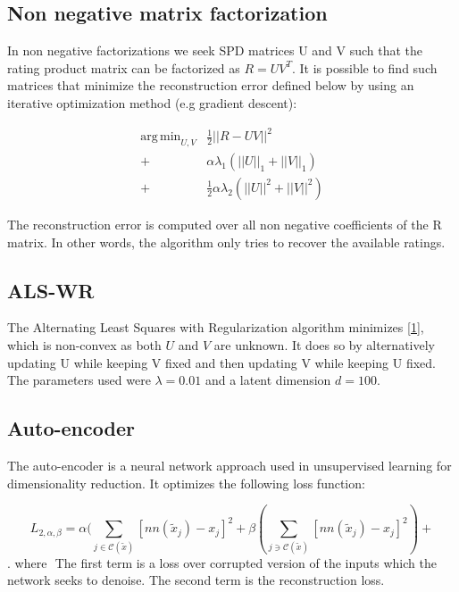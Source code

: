 \documentclass[10pt,twocolumn]{article}
\DeclareMathOperator*{\argmin}{arg\,min}
\begin{document}
\subsection{Non negative matrix factorization}

In non negative factorizations we seek SPD matrices U and V such that the rating product matrix can be factorized as $R = UV^T$. It is possible to find such matrices that minimize the reconstruction error defined below by using an iterative optimization method (e.g gradient descent): 

\begin{equation}
\begin{split}
\argmin_{U,V} & \frac{1}{2} ||R - UV||^2 \\
			  + & \alpha \lambda_1 (||U||_1 + ||V||_1) \\
			  + & \frac{1}{2} \alpha \lambda_2  (||U||^2 + ||V||^2) 
\end{split}
\end{equation}  

The reconstruction error is computed over all non negative coefficients of the R matrix. In other words, the algorithm only tries to recover the available ratings. 

\subsection{ALS-WR}

The Alternating Least Squares with Regularization algorithm \cite{zhou2008large}  minimizes \eqref{1}, which is non-convex as both $U$ and $V$ are unknown. It does so by alternatively updating U while keeping V fixed and then updating V while keeping U fixed. The parameters used were $\lambda = 0.01$ and a latent dimension $d = 100$.


\subsection{Auto-encoder}

The auto-encoder is a neural network approach used in unsupervised learning for dimensionality reduction. It optimizes the following loss function:

$$ L_{2, \alpha, \beta} = \alpha ( \sum_{j \in \mathcal{C}(\tilde{x})} [ nn(\tilde{x}_j) - x_j ]^2 + \beta ( \sum_{j \ni \mathcal{C}(\tilde{x})} [nn(\tilde{x}_j) - x_j ]^2) + $$.
where $ $ The first term is a loss over corrupted version of the inputs which the network seeks to denoise. The second term is the reconstruction loss.
\end{document}
